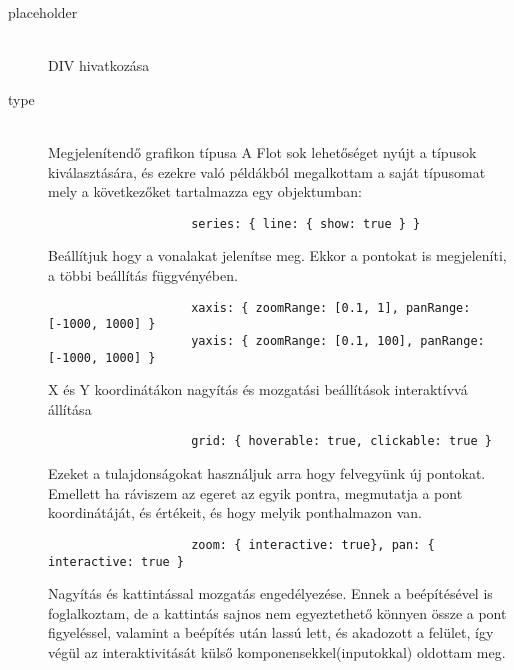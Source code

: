 		\begin{description}
			\item[placeholder] \hfill \\ 
	 			DIV hivatkozása
	 		 \item[type] \hfill \\ 
	 			Megjelenítendő grafikon típusa
	 			\newline
	 			A Flot sok lehetőséget nyújt a típusok kiválasztására, és ezekre való példákból megalkottam a saját típusomat mely a következőket tartalmazza egy objektumban:
		 		
		 		\begin{verbatim}
		 			series: { line: { show: true } } 
		 		\end{verbatim}
				Beállítjuk hogy a vonalakat jelenítse meg. Ekkor a pontokat is megjeleníti, a többi beállítás függvényében.
		 		
		 		\begin{verbatim}
					xaxis: { zoomRange: [0.1, 1], panRange: [-1000, 1000] }
					yaxis: { zoomRange: [0.1, 100], panRange: [-1000, 1000] }
		 		\end{verbatim} 
		 		X és Y koordinátákon nagyítás és mozgatási beállítások interaktívvá állítása
			 	\begin{verbatim}
			 		grid: { hoverable: true, clickable: true }
			 	\end{verbatim} 
			 	Ezeket a tulajdonságokat használjuk arra hogy felvegyünk új pontokat.\newline
			 	Emellett ha ráviszem az egeret az egyik pontra, megmutatja a pont koordinátáját, és értékeit, és hogy melyik ponthalmazon van.
			 	\begin{verbatim}
			 		zoom: { interactive: true}, pan: { interactive: true }
			 	\end{verbatim} 
			 	Nagyítás és kattintással mozgatás engedélyezése. \newline
				Ennek a beépítésével is foglalkoztam, de a kattintás sajnos nem egyeztethető könnyen össze a pont figyeléssel, valamint a beépítés után lassú lett, és akadozott a felület, így végül az interaktivitását külső komponensekkel(inputokkal) oldottam meg.


\end{description}
